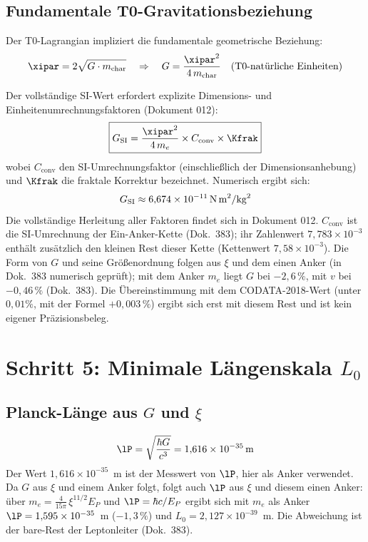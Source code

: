 \subsection{Fundamentale T0-Gravitationsbeziehung}

Der T0-Lagrangian impliziert die fundamentale geometrische Beziehung:
\begin{equation}
	\xipar = 2\sqrt{G \cdot m_{\text{char}}}
	\quad \Rightarrow \quad
	G = \frac{\xipar^2}{4\, m_{\text{char}}} \quad \text{(T0-natürliche Einheiten)}
\end{equation}

Der vollständige SI-Wert erfordert explizite Dimensions- und Einheitenumrechnungsfaktoren (Dokument 012):
\begin{equation}
	\boxed{G_{\text{SI}} = \frac{\xipar^2}{4\, m_e} \times C_{\text{conv}} \times \Kfrak}
	\label{eq:G_from_xi}
\end{equation}
wobei $C_{\text{conv}}$ den SI-Umrechnungsfaktor (einschließlich der Dimensionsanhebung) und $\Kfrak$ die fraktale Korrektur bezeichnet. Numerisch ergibt sich:
\begin{equation}
	G_{\text{SI}} \approx 6{,}674 \times 10^{-11}\,\text{N\,m}^2/\text{kg}^2
\end{equation}
Die vollständige Herleitung aller Faktoren findet sich in Dokument 012. $C_{\text{conv}}$ ist die SI-Umrechnung der Ein-Anker-Kette (Dok.~383); ihr Zahlenwert $7{,}783\times10^{-3}$ enthält zusätzlich den kleinen Rest dieser Kette (Kettenwert $7{,}58\times10^{-3}$). Die Form von $G$ und seine Größenordnung folgen aus $\xi$ und dem einen Anker (in Dok.~383 numerisch geprüft); mit dem Anker $m_e$ liegt $G$ bei $-2{,}6\,\%$, mit $v$ bei $-0{,}46\,\%$ (Dok.~383). Die Übereinstimmung mit dem CODATA-2018-Wert (unter $0{,}01\%$, mit der Formel $+0{,}003\,\%$) ergibt sich erst mit diesem Rest und ist kein eigener Präzisionsbeleg.

\section{Schritt 5: Minimale Längenskala \texorpdfstring{$L_0$}{L0}}

\subsection{Planck-Länge aus $G$ und \texorpdfstring{$\xi$}{xi}}

\begin{equation}
	\lP = \sqrt{\frac{\hbar G}{c^3}} = 1{,}616 \times 10^{-35}\,\text{m}
\end{equation}
Der Wert $1{,}616\times10^{-35}$~m ist der Messwert von $\lP$, hier als Anker verwendet. Da $G$ aus $\xi$ und einem Anker folgt, folgt auch $\lP$ aus $\xi$ und diesem einen Anker: über $m_e = \tfrac{4}{15\pi}\,\xi^{11/2}E_P$ und $\lP = \hbar c/E_P$ ergibt sich mit $m_e$ als Anker $\lP = 1{,}595\times10^{-35}$~m ($-1{,}3\,\%$) und $L_0 = 2{,}127\times10^{-39}$~m. Die Abweichung ist der bare-Rest der Leptonleiter (Dok.~383).

